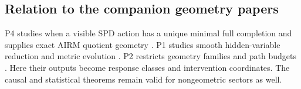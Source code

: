 \subsection{Relation to the companion geometry papers}

P4 studies when a visible SPD action has a unique minimal full completion and supplies exact AIRM quotient geometry \citep{li2026informationinducedgeometry}.  P1 studies smooth hidden-variable reduction and metric evolution \citep{li2026optimizationgeometrodynamics}.  P2 restricts geometry families and path budgets \citep{li2026restrictedcomplexity}.  Here their outputs become response classes and intervention coordinates.  The causal and statistical theorems remain valid for nongeometric sectors as well.
